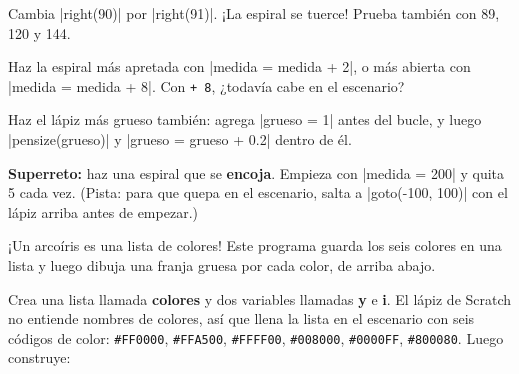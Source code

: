 \enlargethispage{\baselineskip}
\begin{challenge}\small
\tick Cambia \py|right(90)| por \py|right(91)|. ¡La espiral se tuerce! Prueba también con 89, 120 y 144.\par
\tick Haz la espiral más apretada con \py|medida = medida + 2|, o más abierta con \py|medida = medida + 8|. Con \texttt{+ 8}, ¿todavía cabe en el escenario?\par
\tick Haz el lápiz más grueso también: agrega \py|grueso = 1| antes del bucle, y luego \py|pensize(grueso)| y \py|grueso = grueso + 0.2| dentro de él.\par
\tick \textbf{Superreto:} haz una espiral que se \textbf{encoja}. Empieza con \py|medida = 200| y quita 5 cada vez. (Pista: para que quepa en el escenario, salta a \py|goto(-100, 100)| con el lápiz arriba antes de empezar.)
\end{challenge}


¡Un arcoíris es una lista de colores! Este programa guarda los seis colores en una lista y luego dibuja una franja gruesa por cada color, de arriba abajo.

\noindent\begin{minipage}[t]{0.61\linewidth}\vspace{0pt}
\begin{scratch}[scale=0.79]
\end{scratch}
\end{minipage}\hfill\begin{minipage}[t]{0.36\linewidth}\vspace{0pt}
Crea una lista llamada \textbf{colores} y dos variables llamadas \textbf{y} e \textbf{i}. El lápiz de Scratch no entiende nombres de colores, así que llena la lista en el escenario con seis códigos de color: \texttt{\#FF0000}, \texttt{\#FFA500}, \texttt{\#FFFF00}, \texttt{\#008000}, \texttt{\#0000FF}, \texttt{\#800080}. Luego construye:
\end{minipage}


